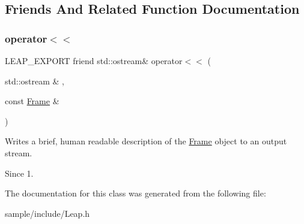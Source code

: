 \subsection{Friends And Related Function Documentation}
\mbox{\label{class_leap_1_1_frame_a3eb142cc11b68e23a4aaa42c7784c6d2}} 
\subsubsection{\texorpdfstring{operator$<$$<$}{operator<<}}
{\footnotesize\ttfamily L\+E\+A\+P\+\_\+\+E\+X\+P\+O\+RT friend std\+::ostream\& operator$<$$<$ (\begin{DoxyParamCaption}\item[{std\+::ostream \&}]{,  }\item[{const \hyperlink{class_leap_1_1_frame}{Frame} \&}]{ }\end{DoxyParamCaption})\hspace{0.3cm}{\ttfamily [friend]}}

Writes a brief, human readable description of the \hyperlink{class_leap_1_1_frame}{Frame} object to an output stream.


\begin{DoxyCodeInclude}
\end{DoxyCodeInclude}


\begin{DoxySince}{Since}
1. 
\end{DoxySince}


The documentation for this class was generated from the following file\+:\begin{DoxyCompactItemize}
\item 
sample/include/Leap.\+h\end{DoxyCompactItemize}
